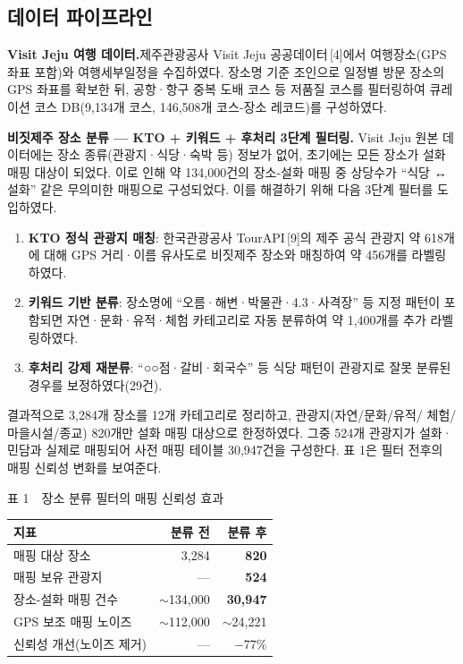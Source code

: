 \documentclass[10pt,twocolumn,a4paper]{article}
\begin{document}
\subsection{데이터 파이프라인}

\textbf{Visit Jeju 여행 데이터.}\quad 제주관광공사 Visit Jeju 공공데이터\,[4]에서
여행장소(GPS 좌표 포함)와 여행세부일정을 수집하였다. 장소명 기준 조인으로
일정별 방문 장소의 GPS 좌표를 확보한 뒤, 공항·항구 중복 도배 코스 등
저품질 코스를 필터링하여 큐레이션 코스 DB(9{,}134개 코스, 146{,}508개
코스-장소 레코드)를 구성하였다.

\textbf{비짓제주 장소 분류 --- KTO + 키워드 + 후처리 3단계 필터링.}\quad
Visit Jeju 원본 데이터에는 장소 종류(관광지·식당·숙박 등) 정보가 없어,
초기에는 모든 장소가 설화 매핑 대상이 되었다. 이로 인해 약 134{,}000건의
장소-설화 매핑 중 상당수가 ``식당 ↔ 설화'' 같은 무의미한 매핑으로
구성되었다. 이를 해결하기 위해 다음 3단계 필터를 도입하였다.

\begin{enumerate}
\setlength{\itemsep}{0pt}
\item \textbf{KTO 정식 관광지 매칭}: 한국관광공사 TourAPI\,[9]의 제주
공식 관광지 약 618개에 대해 GPS 거리·이름 유사도로 비짓제주 장소와
매칭하여 약 456개를 라벨링하였다.
\item \textbf{키워드 기반 분류}: 장소명에 ``오름·해변·박물관·4.3·사격장''
등 지정 패턴이 포함되면 자연·문화·유적·체험 카테고리로 자동 분류하여
약 1{,}400개를 추가 라벨링하였다.
\item \textbf{후처리 강제 재분류}: ``○○점·갈비·회국수'' 등 식당
패턴이 관광지로 잘못 분류된 경우를 보정하였다(29건).
\end{enumerate}

결과적으로 3{,}284개 장소를 12개 카테고리로 정리하고, 관광지(자연/문화/유적/
체험/마을시설/종교) 820개만 설화 매핑 대상으로 한정하였다. 그중 524개 관광지가
설화·민담과 실제로 매핑되어 사전 매핑 테이블 30{,}947건을 구성한다. 표 1은
필터 전후의 매핑 신뢰성 변화를 보여준다.

\begin{table}[H]
\centering
{\small 표 1~~장소 분류 필터의 매핑 신뢰성 효과}
\label{tab:filter}
\vspace{2pt}

\small
\begin{tabular}{lrr}
\toprule
지표 & 분류 전 & 분류 후 \\
\midrule
매핑 대상 장소 & 3{,}284 & \textbf{820} \\
매핑 보유 관광지 & --- & \textbf{524} \\
장소-설화 매핑 건수 & $\sim$134{,}000 & \textbf{30{,}947} \\
GPS 보조 매핑 노이즈 & $\sim$112{,}000 & $\sim$24{,}221 \\
신뢰성 개선(노이즈 제거) & --- & \textbf{$-77\%$} \\
\bottomrule
\end{tabular}
\end{table}
\end{document}
